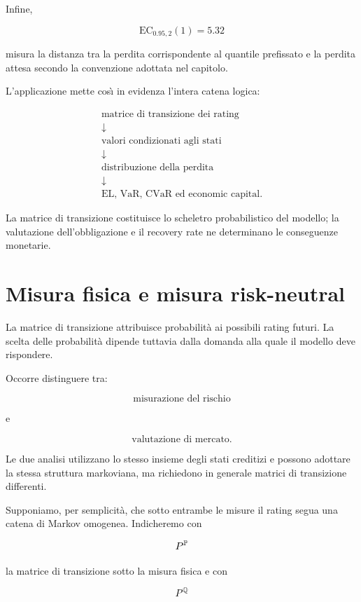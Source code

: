 Infine,

\[
\mathrm{EC}_{0.95,2}(1)=5.32
\]

misura la distanza tra la perdita corrispondente al quantile prefissato e la perdita attesa secondo
la convenzione adottata nel capitolo.

L'applicazione mette cos\`{\i} in evidenza l'intera catena logica:

\[
\boxed{
\begin{array}{c}
\text{matrice di transizione dei rating}
\\
\downarrow
\\
\text{valori condizionati agli stati}
\\
\downarrow
\\
\text{distribuzione della perdita}
\\
\downarrow
\\
\text{EL, VaR, CVaR ed economic capital}.
\end{array}
}
\]

La matrice di transizione costituisce lo scheletro probabilistico del
modello; la valutazione dell'obbligazione e il recovery rate ne
determinano le conseguenze monetarie.

\section{Misura fisica e misura risk-neutral}

\label{sec:cap9-misure-probabilita}

La matrice di transizione attribuisce probabilit\`{a} ai possibili
rating futuri. La scelta delle probabilit\`{a} dipende tuttavia dalla
domanda alla quale il modello deve rispondere.

Occorre distinguere tra:

\[
\text{misurazione del rischio}
\]

e

\[
\text{valutazione di mercato}.
\]

Le due analisi utilizzano lo stesso insieme degli stati creditizi e
possono adottare la stessa struttura markoviana, ma richiedono in
generale matrici di transizione differenti.

Supponiamo, per semplicit\`{a}, che sotto entrambe le misure il rating
segua una catena di Markov omogenea. Indicheremo con

\[
P^{\mathbb{P}}
\]

la matrice di transizione sotto la misura fisica e con

\[
P^{\mathbb{Q}}
\]

